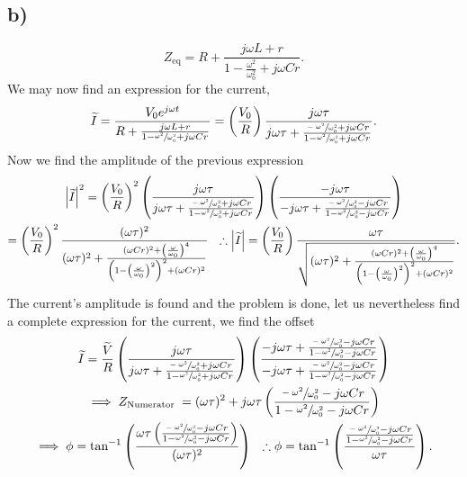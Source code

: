 \documentclass[
	12pt,
	]{article}
\theoremstyle{definition}
\theoremstyle{definition}
\theoremstyle{definition}
\theoremstyle{definition}
\theoremstyle{definition}
\theoremstyle{example}
\theoremstyle{note}
\theoremstyle{remark}
\theoremstyle{example}
\begin{document}
 			\subsection*{b) }
 				\begin{equation*}
 					Z_{\text{eq}} = R + \frac{j\omega L +r }{1- \frac{\omega^{2}}{\omega_{0}^{2}} + j\omega C r}.
 				\end{equation*}
 				We may now find an expression for the current,
 				\begin{gather*}
 					\widetilde{I} = \frac{V_{0}e^{j\omega t}}{R + \frac{j\omega L +r }{1- \sfrac{\omega^{2}}{\omega_{0}^{2}} + j\omega C r}} = \left(\frac{V_{0}}{R}\right) \frac{j\omega \tau}{j\omega \tau + \frac{\sfrac{-\omega^{2}}{\omega_{0}^{2}} + j\omega C r}{1 - \sfrac{\omega^{2}}{\omega_{0}^{2}} + j\omega C r}}.
 				\end{gather*}
 				Now we find the amplitude of the previous expression
 				\begin{gather*}
 					\abs{\widetilde{I}}^{2} = \left(\frac{V_{0}}{R}\right)^{2} \left( \frac{j\omega \tau}{j\omega \tau + \frac{\sfrac{-\omega^{2}}{\omega_{0}^{2}} + j\omega C r}{1 - \sfrac{\omega^{2}}{\omega_{0}^{2}} + j\omega C r}}\right)\left( \frac{-j\omega \tau}{-j\omega \tau + \frac{\sfrac{-\omega^{2}}{\omega_{0}^{2}} -j\omega C r}{1 - \sfrac{\omega^{2}}{\omega_{0}^{2}} -j\omega C r}}\right) \\
 					 = \left(\frac{V_{0}}{R}\right)^{2} \frac{(\omega\tau)^{2}}{(\omega\tau)^{2} + \frac{(\omega C r)^{2} + \left(\frac{\omega}{\omega_{0}}\right)^{4}}{\left(1-\left(\frac{\omega}{\omega_{0}}\right)^{2}\right)^{2} + (\omega C r)^{2}}} \ \ \therefore \abs{\widetilde{I}} = \left(\frac{V_{0}}{R}\right) \frac{\omega\tau}{\sqrt{(\omega\tau)^{2} + \frac{(\omega C r)^{2} + \left(\frac{\omega}{\omega_{0}}\right)^{4}}{\left(1-\left(\frac{\omega}{\omega_{0}}\right)^{2}\right)^{2} + (\omega C r)^{2}}}}.
 				\end{gather*}
 				The current's amplitude is found and the problem is done, let us nevertheless find a complete expression for the current, we find the offset
 				\begin{gather*}
 					\widetilde{I} = \frac{\widetilde{V}}{R} \left(\frac{j\omega \tau}{j\omega \tau + \frac{\sfrac{-\omega^{2}}{\omega_{0}^{2}} + j\omega C r}{1 - \sfrac{\omega^{2}}{\omega_{0}^{2}} + j\omega C r}}\right)\left(\frac{-j\omega \tau + \frac{\sfrac{-\omega^{2}}{\omega_{0}^{2}} - j\omega C r}{1 - \sfrac{\omega^{2}}{\omega_{0}^{2}} - j\omega C r}}{-j\omega \tau + \frac{\sfrac{-\omega^{2}}{\omega_{0}^{2}} -j\omega C r}{1 - \sfrac{\omega^{2}}{\omega_{0}^{2}} - j\omega C r}}\right) \\
 					\implies Z_{\text{Numerator }} = (\omega \tau)^{2} + j\omega\tau \left(\frac{\sfrac{-\omega^{2}}{\omega_{0}^{2}} -j\omega C r}{1 - \sfrac{\omega^{2}}{\omega_{0}^{2}} - j\omega C r}\right) \\ \implies \phi = \tan^{-1} \left(\frac{\omega\tau \left(\frac{\sfrac{-\omega^{2}}{\omega_{0}^{2}} -j\omega C r}{1 - \sfrac{\omega^{2}}{\omega_{0}^{2}} - j\omega C r}\right)}{(\omega\tau)^{2}}\right) \ \ \therefore \phi = \tan^{-1}\left(\frac{\frac{\sfrac{-\omega^{2}}{\omega_{0}^{2}} -j\omega C r}{1 - \sfrac{\omega^{2}}{\omega_{0}^{2}} - j\omega C r}}{\omega\tau}\right).
 				\end{gather*}
\end{document}
